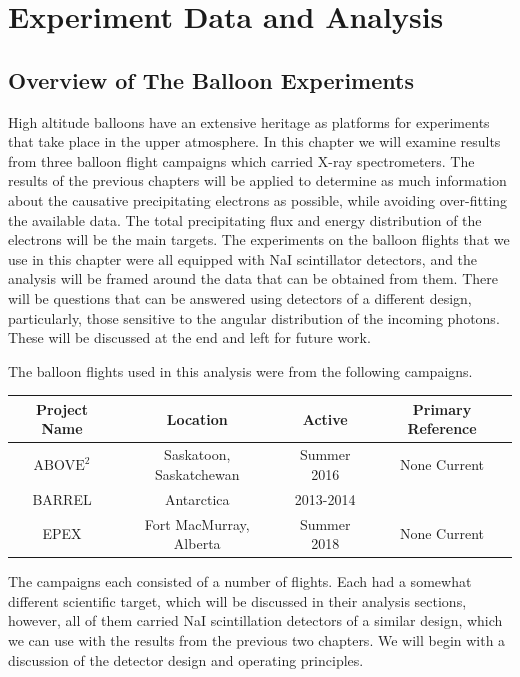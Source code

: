 \chapter{Experiment Data and Analysis}

\section{Overview of The Balloon Experiments}

High altitude balloons have an extensive heritage as platforms for experiments that take place in the upper atmosphere. In this chapter we will examine results from three balloon flight campaigns which carried X-ray spectrometers. The results of the previous chapters will be applied to determine as much information about the causative precipitating electrons as possible, while avoiding over-fitting the available data. The total precipitating flux and energy distribution of the electrons will be the main targets. The experiments on the balloon flights that we use in this chapter were all equipped with NaI scintillator detectors, and the analysis will be framed around the data that can be obtained from them. There will be questions that can be answered using detectors of a different design, particularly, those sensitive to the angular distribution of the incoming photons. These will be discussed at the end and left for future work. 

The balloon flights used in this analysis were from the following campaigns.

\begin{center}
\begin{tabular}{ |c|c|c|c| } 
\hline
Project Name & Location & Active & Primary Reference \\
\hline
$\text{ABOVE}^2$ & Saskatoon, Saskatchewan & Summer 2016 & None Current\\
\hline
BARREL & Antarctica & 2013-2014 & \citet{Millan2014}\\
\hline
EPEX & Fort MacMurray, Alberta & Summer 2018 & None Current\\
\hline
\end{tabular}
\end{center}

The campaigns each consisted of a number of flights. Each had a somewhat different scientific target, which will be discussed in their analysis sections, however, all of them carried NaI scintillation detectors of a similar design, which we can use with the results from the previous two chapters. We will begin with a discussion of the detector design and operating principles. 

